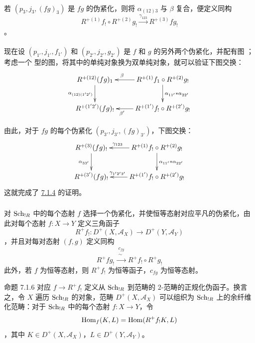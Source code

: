 \paragraph{}
若 $(p_{3},j_{3},(fg)_{3})$ 是 $fg$ 的伪紧化，则将 $\alpha_{(12)3}$ 与 $\beta$ 复合，便定义同构
\[
R^{+(1)}f_{!}\circ
R^{+(2)}g_{!}\xrightarrow{\gamma_{123}}R^{+(3)}fg_{!}
\]
。

\paragraph{}
现在设 $(p_{1'},j_{1'},f_{1'})$ 和 $(p_{2'},j_{2'},g_{2'})$ 是 $f$ 和 $g$ 的另外两个伪紧化，并配有图 ；考虑一个  型的图，将其中的单纯对象换为双单纯对象，就可以验证下图交换：
\[
\xymatrix{
R^{+(12)}\sisi{fg}{(fg)}_1 \ar[d]_{\alpha_{(12)(1'2')}} & R^{+(1)}f_1 \circ
R^{+(2)}g_! \ar[d]^{\alpha_{11'}\ast \alpha_{22'}} \ar[l]_(.6){\beta}\\
R^{+(1'2')}\sisi{fg}{(fg)}_!  & R^{+(1')}f_! \circ R^{+(2')}g_! \ar[l]^(.6){\beta'}
}
\]

由此，对于 $fg$ 的每个伪紧化 $(p_{3'},j_{3'},(fg)_{3'})$，下图交换：
\[
\xymatrix{
R^{+(3)}\sisi{fg}{(fg)}_! \ar[d]_{\alpha_{33'}}& R^{+(1)}f_! \circ R^{+(2)}g_!
\ar[l]_(.6){\gamma_{123}} \ar[d]^{\alpha_{11'}\ast
  \alpha_{22'}}\\
R^{+(3')}\sisi{fg}{(fg)}_!  & R^{+(1')}f_! \circ R^{+(2')}g_! \ar[l]_(.6){\gamma_{1'2'3'}}
}
\]
这就完成了 \hyperref[XVII.constru7.1.4]{7.1.4} 的证明。

\subsubsection{}
对 $\operatorname{Sch}_{!R}$ 中的每个态射 $f$ 选择一个伪紧化，并使恒等态射对应平凡的伪紧化，由此对每个态射 $f:X\rightarrow Y$ 定义三角函子
\[
R^{+}f_{!}:D^{+}(X,\mathcal{A}_{X})\longrightarrow
D^{+}(Y,\mathcal{A}_{Y})
\]
，并且\pageoriginale 对每对态射 $(f,g)$ 定义同构
\[
R^{+}fg_{!}\xrightarrow{\substack{c_{fg}\\\sim}}
R^{+}f_{!}\circ R^{+}g_{!}
\]
此外，若 $f$ 为恒等态射，则 $R^{+}f_{!}$ 为恒等函子，$c_{fg}$ 为恒等态射。

\begin{enonce*}{命题 7.1.6}
对应 $f\rightarrow R^{+}f_{!}$ 定义从 $\operatorname{Sch}_{!R}$ 到范畴的 $2$-范畴的正规化伪函子。换言之，令 $X$ 遍历 $\operatorname{Sch}_{!R}$ 的对象，范畴 $D^{+}(X,\mathcal{A}_{X})$ 可以组织为 $\operatorname{Sch}_{!R}$ 上的余纤维化范畴：对于 $\operatorname{Sch}_{!R}$ 中的每个态射 $f:X\rightarrow Y$，令
\[
\operatorname{Hom}_{f}(K,L)=\operatorname{Hom}(R^{+}f_{!}K,L)
\]
，其中 $K\in D^{+}(X,\mathcal{A}_{X})$，$L\in D^{+}(Y,\mathcal{A}_{Y})$。
\end{enonce*}

